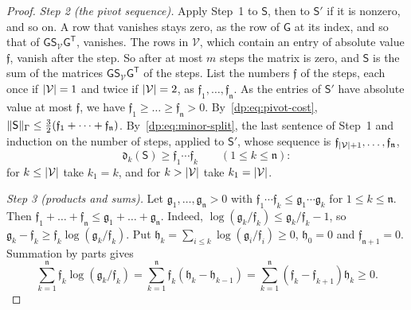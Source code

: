 \begin{proof}
\emph{Step 2 (the pivot sequence).} Apply Step~1 to $\mathsf S$, then to $\mathsf S'$ if it is nonzero, and so on. A row that vanishes stays zero, as the row of $\mathsf G$ at its index, and so that of $\mathsf G\mathsf S_{\mathcal V}\mathsf G^{\mathsf T}$, vanishes. The rows in $\mathcal V$, which contain an entry of absolute value $\mathfrak f$, vanish after the step. So after at most $m$ steps the matrix is zero, and $\mathsf S$ is the sum of the matrices $\mathsf G\mathsf S_{\mathcal V}\mathsf G^{\mathsf T}$ of the steps. List the numbers $\mathfrak f$ of the steps, each once if $\lvert \mathcal V\rvert=1$ and twice if $\lvert \mathcal V\rvert=2$, as $\mathfrak f_1,\dots,\mathfrak f_{\mathfrak n}$. As the entries of $\mathsf S'$ have absolute value at most $\mathfrak f$, we have $\mathfrak f_1\ge\dots\ge\mathfrak f_{\mathfrak n}>0$. By~\eqref{dp:eq:pivot-cost}, $\lVert \mathsf S\rVert_\Gamma\le\frac32(\mathfrak f_1+\dots+\mathfrak f_{\mathfrak n})$. By~\eqref{dp:eq:minor-split}, the last sentence of Step~1 and induction on the number of steps, applied to $\mathsf S'$, whose sequence is $\mathfrak f_{\lvert \mathcal V\rvert+1},\dots,\mathfrak f_{\mathfrak n}$,
\begin{equation}\label{dp:eq:minor-lower}
 \mathfrak d_k(\mathsf S)\ge\mathfrak f_1\cdots\mathfrak f_k\qquad(1\le k\le\mathfrak n):
\end{equation}
for $k\le\lvert \mathcal V\rvert$ take $k_1=k$, and for $k>\lvert \mathcal V\rvert$ take $k_1=\lvert \mathcal V\rvert$.

\emph{Step 3 (products and sums).} Let $\mathfrak g_1,\dots,\mathfrak g_{\mathfrak n}>0$ with $\mathfrak f_1\cdots\mathfrak f_k\le\mathfrak g_1\cdots\mathfrak g_k$ for $1\le k\le\mathfrak n$. Then $\mathfrak f_1+\dots+\mathfrak f_{\mathfrak n}\le\mathfrak g_1+\dots+\mathfrak g_{\mathfrak n}$. Indeed, $\log(\mathfrak g_k/\mathfrak f_k)\le\mathfrak g_k/\mathfrak f_k-1$, so $\mathfrak g_k-\mathfrak f_k\ge\mathfrak f_k\log(\mathfrak g_k/\mathfrak f_k)$. Put $\mathfrak h_k=\sum_{i\le k}\log(\mathfrak g_i/\mathfrak f_i)\ge0$, $\mathfrak h_0=0$ and $\mathfrak f_{\mathfrak n+1}=0$. Summation by parts gives
\[
 \sum_{k=1}^{\mathfrak n}\mathfrak f_k\log(\mathfrak g_k/\mathfrak f_k)=\sum_{k=1}^{\mathfrak n}\mathfrak f_k(\mathfrak h_k-\mathfrak h_{k-1})
 =\sum_{k=1}^{\mathfrak n}(\mathfrak f_k-\mathfrak f_{k+1})\mathfrak h_k\ge0.
\]


\end{proof}
